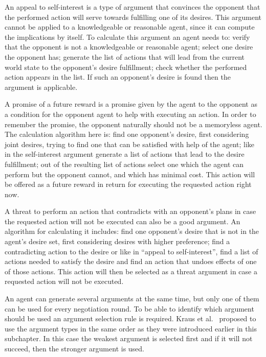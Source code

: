 An appeal to self-interest is a type of argument that convinces the opponent that the performed action will serve towards fulfilling one of its desires.
This argument cannot be applied to a knowledgeable or reasonable agent, since it can compute the implications by itself.
To calculate this argument an agent needs to: verify that the opponent is not a knowledgeable or reasonable agent; select one desire the opponent has; generate the list of actions that will lead from the current world state to the opponent's desire fulfillment; check whether the performed action appears in the list.
If such an opponent's desire is found then the argument is applicable.

A promise of a future reward is a promise given by the agent to the opponent as a condition for the opponent agent to help with executing an action.
In order to remember the promise, the opponent naturally should not be a memoryless agent.
The calculation algorithm here is: find one opponent's desire, first considering joint desires, trying to find one that can be satisfied with help of the agent; like in the self-interest argument generate a list of actions that lead to the desire fulfillment; out of the resulting list of actions select one which the agent can perform but the opponent cannot, and which has minimal cost.
This action will be offered as a future reward in return for executing the requested action right now.

A threat to perform an action that contradicts with an opponent's plans in case the requested action will not be executed can also be a good argument.
An algorithm for calculating it includes: find one opponent's desire that is not in the agent's desire set, first considering desires with higher preference; find a contradicting action to the desire or like in \enquote{appeal to self-interest}, find a list of actions needed to satisfy the desire and find an action that undoes effects of one of those actions.
This action will then be selected as a threat argument in case a requested action will not be executed.

An agent can generate several arguments at the same time, but only one of them can be used for every negotiation round.
To be able to identify which argument should be used an argument selection rule is required.
Kraus et al.~\cite{Kraus_98} proposed to use the argument types in the same order as they were introduced earlier in this subchapter.
In this case the weakest argument is selected first and if it will not succeed, then the stronger argument is used.

